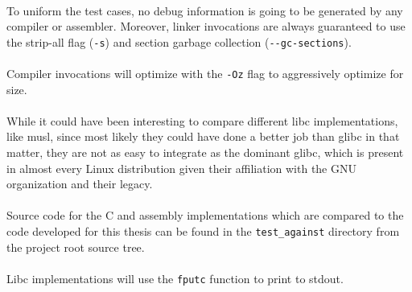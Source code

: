 \documentclass[12pt]{article}
\begin{document}
	\paragraph{}To uniform the test cases, no debug information is going to be generated by any compiler or assembler. Moreover, linker invocations are always guaranteed to use the strip-all flag (\verb|-s|) and section garbage collection (\verb|--gc-sections|)\cite{man-ld}.
	\paragraph{}Compiler invocations will optimize with the \verb|-Oz| flag to aggressively optimize for size\cite{man-clang}.
	\paragraph{}While it could have been interesting to compare different libc implementations, like musl\cite{musl}, since most likely they could have done a better job than \gls{glibc} in that matter\cite{libc-comparisons}, they are not as easy to integrate\cite{how-musl} as the dominant \gls{glibc}, which is present in almost every Linux distribution given their affiliation with the \acrshort{GNU} organization and their legacy\cite{glibc}.
	\paragraph{}Source code for the C and assembly implementations which are compared to the code developed for this thesis can be found in the \verb|test_against| directory from the project root source tree.
	\paragraph{}Libc implementations will use the \verb|fputc| function to print to stdout.
\end{document}
